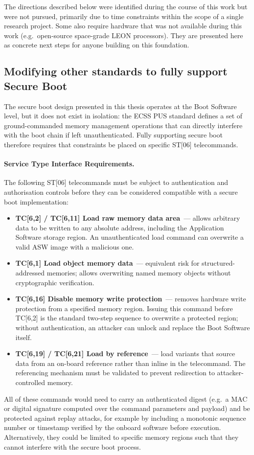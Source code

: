 The directions described below were identified during the course of this work but were not pursued, primarily due to time constraints within the scope of a single research project. Some also require hardware that was not available during this work (e.g.\ open-source space-grade LEON processors). They are presented here as concrete next steps for anyone building on this foundation.

\subsection{Modifying other standards to fully support Secure Boot}
\label{subsection:conclusion-futureWork-standards}

The secure boot design presented in this thesis operates at the Boot Software level, but it does not exist in isolation: the ECSS PUS standard \cite{ECSS-E-ST-70-41C} defines a set of ground-commanded memory management operations that can directly interfere with the boot chain if left unauthenticated. Fully supporting secure boot therefore requires that constraints be placed on specific ST[06] telecommands.

\paragraph{Service Type Interface Requirements.}
The following ST[06] telecommands must be subject to authentication and authorisation controls before they can be considered compatible with a secure boot implementation:
\begin{itemize}
    \item \textbf{TC[6,2] / TC[6,11] Load raw memory data area}~--- allows arbitrary data to be written to any absolute address, including the Application Software storage region. An unauthenticated load command can overwrite a valid ASW image with a malicious one.
    \item \textbf{TC[6,1] Load object memory data}~--- equivalent risk for structured-addressed memories; allows overwriting named memory objects without cryptographic verification.
    \item \textbf{TC[6,16] Disable memory write protection}~--- removes hardware write protection from a specified memory region. Issuing this command before TC[6,2] is the standard two-step sequence to overwrite a protected region; without authentication, an attacker can unlock and replace the Boot Software itself.
    \item \textbf{TC[6,19] / TC[6,21] Load by reference}~--- load variants that source data from an on-board reference rather than inline in the telecommand. The referencing mechanism must be validated to prevent redirection to attacker-controlled memory.
\end{itemize}
All of these commands would need to carry an authenticated digest (e.g.~a MAC or digital signature computed over the command parameters and payload) and be protected against replay attacks, for example by including a monotonic sequence number or timestamp verified by the onboard software before execution. Alternatively, they could be limited to specific memory regions such that they cannot interfere with the secure boot process.


